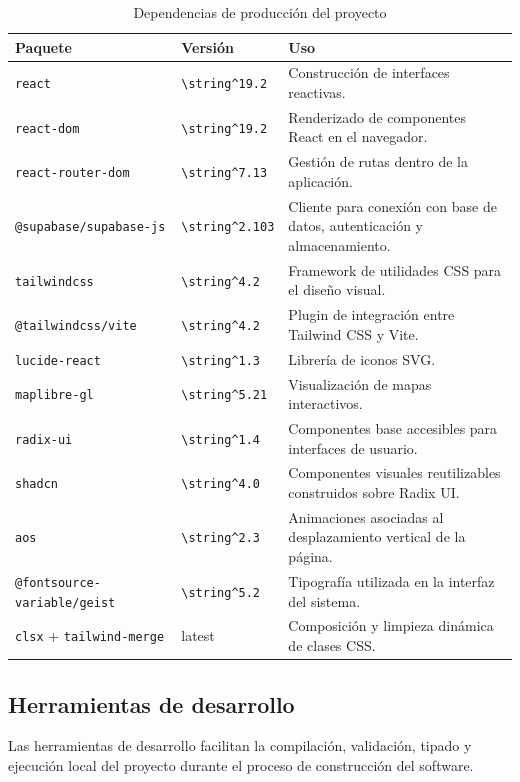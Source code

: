 \documentclass[12pt,letterpaper]{article}
\newcommand{\code}[1]{\nolinkurl{#1}}
\begin{document}
\begin{longtable}{|p{}|p{}|p{}|}
\caption{Dependencias de producción del proyecto}\\
\hline
\textbf{Paquete} & \textbf{Versión} & \textbf{Uso} \\
\hline
\code{react} & \code{\string^19.2} & Construcción de interfaces reactivas. \\
\hline
\code{react-dom} & \code{\string^19.2} & Renderizado de componentes React en el navegador. \\
\hline
\code{react-router-dom} & \code{\string^7.13} & Gestión de rutas dentro de la aplicación. \\
\hline
\code{@supabase/supabase-js} & \code{\string^2.103} & Cliente para conexión con base de datos, autenticación y almacenamiento. \\
\hline
\code{tailwindcss} & \code{\string^4.2} & Framework de utilidades CSS para el diseño visual. \\
\hline
\code{@tailwindcss/vite} & \code{\string^4.2} & Plugin de integración entre Tailwind CSS y Vite. \\
\hline
\code{lucide-react} & \code{\string^1.3} & Librería de iconos SVG. \\
\hline
\code{maplibre-gl} & \code{\string^5.21} & Visualización de mapas interactivos. \\
\hline
\code{radix-ui} & \code{\string^1.4} & Componentes base accesibles para interfaces de usuario. \\
\hline
\code{shadcn} & \code{\string^4.0} & Componentes visuales reutilizables construidos sobre Radix UI. \\
\hline
\code{aos} & \code{\string^2.3} & Animaciones asociadas al desplazamiento vertical de la página. \\
\hline
\code{@fontsource-variable/geist} & \code{\string^5.2} & Tipografía utilizada en la interfaz del sistema. \\
\hline
\code{clsx} + \code{tailwind-merge} & latest & Composición y limpieza dinámica de clases CSS. \\
\hline
\end{longtable}

\subsection{Herramientas de desarrollo}

Las herramientas de desarrollo facilitan la compilación, validación, tipado y ejecución local del proyecto durante el proceso de construcción del software.
\end{document}
